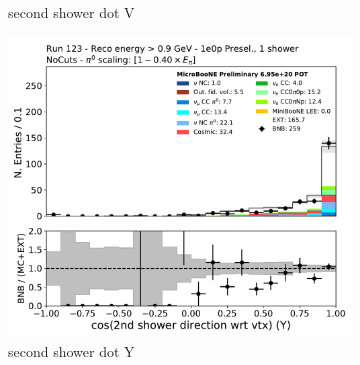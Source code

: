 \begin{figure}[H]
\begin{subfigure}{0.3\textwidth}
    \caption{second shower dot V}
    \end{subfigure}
    \begin{subfigure}{0.3\textwidth}
    \includegraphics[width=1.0\textwidth]{1e0p/High_E_Sideband/secondshower_Y_dot.pdf}
    \caption{second shower dot Y}
    \end{subfigure}
    \caption{} 
    \label{fig:HE_1eNp_1}
\end{figure}

